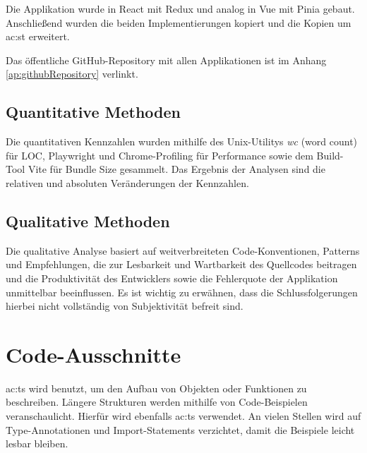Die Applikation wurde in React mit Redux und analog in Vue mit Pinia gebaut. Anschließend wurden die beiden Implementierungen kopiert und die Kopien um \acrlong{ac:st} erweitert.

Das öffentliche GitHub-Repository mit allen Applikationen ist im Anhang \ref{ap:githubRepository} verlinkt.

\subsection{Quantitative Methoden}
Die quantitativen Kennzahlen wurden mithilfe des Unix-Utilitys \textit{wc} (word count) für LOC, Playwright und Chrome-Profiling für Performance sowie dem Build-Tool Vite für Bundle Size gesammelt. Das Ergebnis der Analysen sind die relativen und absoluten Veränderungen der Kennzahlen.

\subsection{Qualitative Methoden}
Die qualitative Analyse basiert auf weitverbreiteten Code-Konventionen, Patterns und Empfehlungen, die zur Lesbarkeit und Wartbarkeit des Quellcodes beitragen und die Produktivität des Entwicklers sowie die Fehlerquote der Applikation unmittelbar beeinflussen. Es ist wichtig zu erwähnen, dass die Schlussfolgerungen hierbei nicht vollständig von Subjektivität befreit sind.

\section{Code-Ausschnitte}

\acrlong{ac:ts} wird benutzt, um den Aufbau von Objekten oder Funktionen zu beschreiben. Längere Strukturen werden mithilfe von Code-Beispielen veranschaulicht. Hierfür wird ebenfalls \acrlong{ac:ts} verwendet. An vielen Stellen wird auf Type-Annotationen und Import-Statements verzichtet, damit die Beispiele leicht lesbar bleiben.
